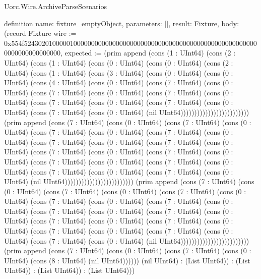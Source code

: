\begin{lexlean}{Uorc.Wire.ArchiveParseScenarios}
\begin{semanticmodule}
definition{
  name: fixture_emptyObject,
  parameters: [],
  result: Fixture,
  body: (record Fixture {wire := 0x554f5243020100000100000000000000000000000000000000000000000000000000000000000000000000, expected := (prim append (cons (1 : UInt64) (cons (2 : UInt64) (cons (1 : UInt64) (cons (0 : UInt64) (cons (0 : UInt64) (cons (2 : UInt64) (cons (1 : UInt64) (cons (3 : UInt64) (cons (0 : UInt64) (cons (0 : UInt64) (cons (4 : UInt64) (cons (0 : UInt64) (cons (7 : UInt64) (cons (0 : UInt64) (cons (7 : UInt64) (cons (0 : UInt64) (cons (7 : UInt64) (cons (0 : UInt64) (cons (7 : UInt64) (cons (0 : UInt64) (cons (7 : UInt64) (cons (0 : UInt64) (cons (7 : UInt64) (cons (0 : UInt64) (nil UInt64))))))))))))))))))))))))) (prim append (cons (7 : UInt64) (cons (0 : UInt64) (cons (7 : UInt64) (cons (0 : UInt64) (cons (7 : UInt64) (cons (0 : UInt64) (cons (7 : UInt64) (cons (0 : UInt64) (cons (7 : UInt64) (cons (0 : UInt64) (cons (7 : UInt64) (cons (0 : UInt64) (cons (7 : UInt64) (cons (0 : UInt64) (cons (7 : UInt64) (cons (0 : UInt64) (cons (7 : UInt64) (cons (0 : UInt64) (cons (7 : UInt64) (cons (0 : UInt64) (cons (7 : UInt64) (cons (0 : UInt64) (cons (7 : UInt64) (cons (0 : UInt64) (nil UInt64))))))))))))))))))))))))) (prim append (cons (7 : UInt64) (cons (0 : UInt64) (cons (7 : UInt64) (cons (0 : UInt64) (cons (7 : UInt64) (cons (0 : UInt64) (cons (7 : UInt64) (cons (0 : UInt64) (cons (7 : UInt64) (cons (0 : UInt64) (cons (7 : UInt64) (cons (0 : UInt64) (cons (7 : UInt64) (cons (0 : UInt64) (cons (7 : UInt64) (cons (0 : UInt64) (cons (7 : UInt64) (cons (0 : UInt64) (cons (7 : UInt64) (cons (0 : UInt64) (cons (7 : UInt64) (cons (0 : UInt64) (cons (7 : UInt64) (cons (0 : UInt64) (nil UInt64))))))))))))))))))))))))) (prim append (cons (7 : UInt64) (cons (0 : UInt64) (cons (7 : UInt64) (cons (0 : UInt64) (cons (8 : UInt64) (nil UInt64)))))) (nil UInt64) : (List UInt64)) : (List UInt64)) : (List UInt64)) : (List UInt64))})
}


\end{semanticmodule}
\end{lexlean}
